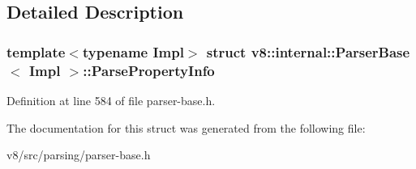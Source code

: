 \subsection{Detailed Description}
\subsubsection*{template$<$typename Impl$>$\newline
struct v8\+::internal\+::\+Parser\+Base$<$ Impl $>$\+::\+Parse\+Property\+Info}



Definition at line 584 of file parser-\/base.\+h.



The documentation for this struct was generated from the following file\+:\begin{DoxyCompactItemize}
\item 
v8/src/parsing/parser-\/base.\+h\end{DoxyCompactItemize}
